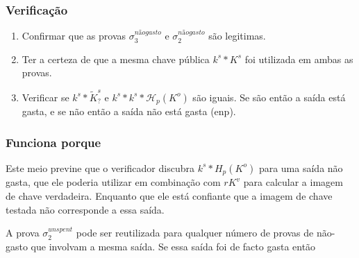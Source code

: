 
\subsubsection*{Verificação}

\begin{enumerate}
    \item Confirmar que as provas $\sigma^{nãogasto}_3$ e $\sigma^{nãogasto}_2$ são legitimas.
    \item Ter a certeza de que a mesma chave pública $k^s*K^s$ foi utilizada em ambas as provas. 
    \item Verificar se $k^s*\tilde{K}^s_?$ e $k^s*k^s*\mathcal{H}_p(K^o)$ são iguais. Se são então a saída está gasta, e se não então a saída não está gasta (enp).

\end{enumerate}{}

\subsubsection*{Funciona porque}

Este meio previne que o verificador discubra $k^s*H_p(K^o)$ para uma saída não gasta, que ele poderia utilizar em combinação com $r K^v$ para calcular a imagem de chave verdadeira.
Enquanto que ele está confiante que a imagem de chave testada não corresponde a essa saída.

A prova $\sigma^{unspent}_2$ pode ser reutilizada para qualquer número de provas de não-gasto que involvam a mesma saída. Se essa saída foi de facto gasta então  


